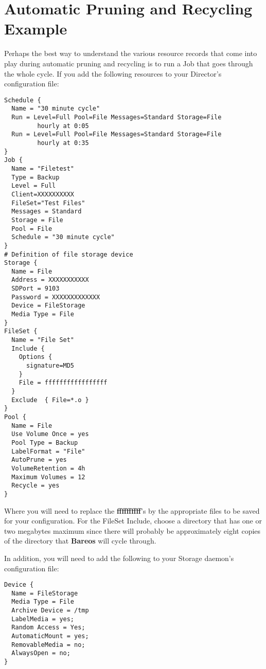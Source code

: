 \section{Automatic Pruning and Recycling Example}
\label{PruningExample}


Perhaps the best way to understand the various resource records that come into
play during automatic pruning and recycling is to run a Job that goes through
the whole cycle. If you add the following resources to your Director's
configuration file:

\footnotesize
\begin{verbatim}
Schedule {
  Name = "30 minute cycle"
  Run = Level=Full Pool=File Messages=Standard Storage=File
         hourly at 0:05
  Run = Level=Full Pool=File Messages=Standard Storage=File
         hourly at 0:35
}
Job {
  Name = "Filetest"
  Type = Backup
  Level = Full
  Client=XXXXXXXXXX
  FileSet="Test Files"
  Messages = Standard
  Storage = File
  Pool = File
  Schedule = "30 minute cycle"
}
# Definition of file storage device
Storage {
  Name = File
  Address = XXXXXXXXXXX
  SDPort = 9103
  Password = XXXXXXXXXXXXX
  Device = FileStorage
  Media Type = File
}
FileSet {
  Name = "File Set"
  Include {
    Options {
      signature=MD5
    }
    File = fffffffffffffffff
  }
  Exclude  { File=*.o }
}
Pool {
  Name = File
  Use Volume Once = yes
  Pool Type = Backup
  LabelFormat = "File"
  AutoPrune = yes
  VolumeRetention = 4h
  Maximum Volumes = 12
  Recycle = yes
}
\end{verbatim}
\normalsize

Where you will need to replace the {\bf ffffffffff}'s by the appropriate files
to be saved for your configuration. For the FileSet Include, choose a
directory that has one or two megabytes maximum since there will probably be
approximately eight copies of the directory that {\bf Bareos} will cycle through.

In addition, you will need to add the following to your Storage daemon's
configuration file:

\footnotesize
\begin{verbatim}
Device {
  Name = FileStorage
  Media Type = File
  Archive Device = /tmp
  LabelMedia = yes;
  Random Access = Yes;
  AutomaticMount = yes;
  RemovableMedia = no;
  AlwaysOpen = no;
}
\end{verbatim}
\normalsize


